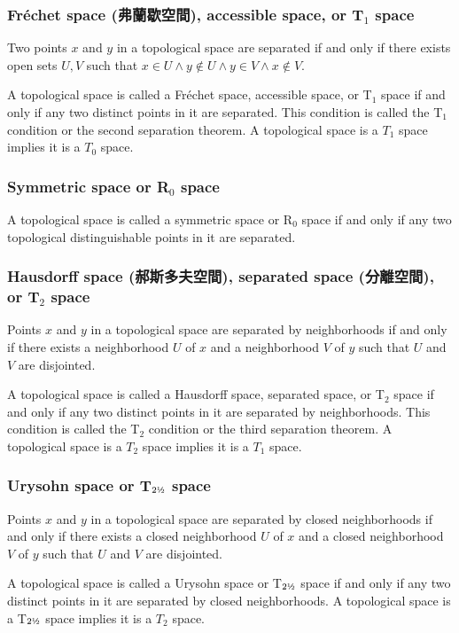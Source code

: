 \documentclass[a4paper,12pt]{article}
\begin{document}
\subsubsection{Fréchet space (弗蘭歇空間), accessible space, or T$_1$ space}
Two points $x$ and $y$ in a topological space are separated if and only if there exists open sets $U,V$ such that $x\in U\land y\notin U\land y\in V\land x\notin V$.

A topological space is called a Fréchet space, accessible space, or T$_1$ space if and only if any two distinct points in it are separated. This condition is called the T$_1$ condition or the second separation theorem. A topological space is a $T_1$ space implies it is a $T_0$ space.
\subsubsection{Symmetric space or R$_0$ space}
A topological space is called a symmetric space or R$_0$ space if and only if any two topological distinguishable points in it are separated.
\subsubsection{Hausdorff space (郝斯多夫空間), separated space (分離空間), or T$_2$ space}
Points $x$ and $y$ in a topological space are separated by neighborhoods if and only if there exists a neighborhood $U$ of $x$ and a neighborhood $V$ of $y$ such that $U$ and $V$ are disjointed.

A topological space is called a Hausdorff space, separated space, or T$_2$ space if and only if any two distinct points in it are separated by neighborhoods. This condition is called the T$_2$ condition or the third separation theorem. A topological space is a $T_2$ space implies it is a $T_1$ space.
\subsubsection{Urysohn space or T\(_{2\text{\textonehalf}}\) space}
Points $x$ and $y$ in a topological space are separated by closed neighborhoods if and only if there exists a closed neighborhood $U$ of $x$ and a closed neighborhood $V$ of $y$ such that $U$ and $V$ are disjointed.

A topological space is called a Urysohn space or T\(_{2\text{\textonehalf}}\) space if and only if any two distinct points in it are separated by closed neighborhoods. A topological space is a T\(_{2\text{\textonehalf}}\) space implies it is a $T_2$ space.
\end{document}
